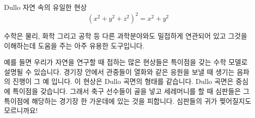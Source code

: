 \begin{surferPage}{Dullo}
자연 속의 유일한 현상\\
\smallskip
\[(x^2+ y^2+ z^2)^2	= x^2+ y^2\]

\singlespacing
수학은 물리, 화학 그리고 공학 등 다른 과학분야와도 밀접하게 연관되어 있고 그것을 이해하는데 도움을 주는 아주 유용한 도구입니다.

\singlespacing
예를 들면 우리가 자연을 연구할 때 접하는 많은 현상들은 특이점을 갖는 수학 모델로 설명될 수 있습니다. 
\singlespacing
경기장 안에서 관중들이 열화와 같은 응원을 보낼 때 생기는 음파의 진행이 그 예 입니다. 이 현상은 Dullo 곡면의 형태를 같습니다. Dullo 곡면은 중심에 특이점을 갖습니다. 그래서 축구 선수들이 골을 넣고 세레머니를 할 때 심판들은 그 특이점에 해당하는 경기장 한 가운데에 있는 것을 피합니다. 심판들의 귀가 찢어질지도 모르니까요!
\end{surferPage}
